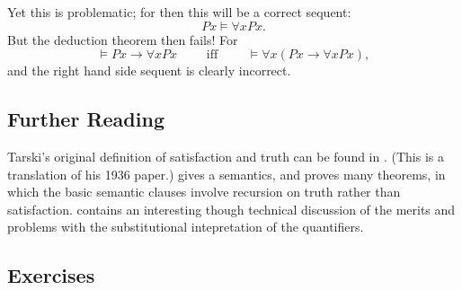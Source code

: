 Yet this is problematic; for then this will be a correct sequent: \begin{equation*}
	Px \vDash \forall x Px.
\end{equation*}
But the deduction theorem then fails! For \begin{equation*}
	\vDash Px\to \forall x Px \qquad\text{ iff }\qquad \vDash\forall x (Px \to \forall x Px),
 \end{equation*} and the right hand side sequent is clearly incorrect.

{\small
\subsection*{Further Reading}

 Tarski's original definition of satisfaction and truth can be found in \citet{tarcontrf}. (This is a translation of his 1936 paper.) \citet[\S\S 3.4--3.6]{bosintlo}  gives a semantics, and proves many theorems, in which the basic semantic clauses involve recursion on truth rather than satisfaction.  \citet{kriisthp} contains an interesting though technical discussion of the merits and problems with the substitutional intepretation of the quantifiers.



\subsection*{Exercises} \label{ex7}


}
